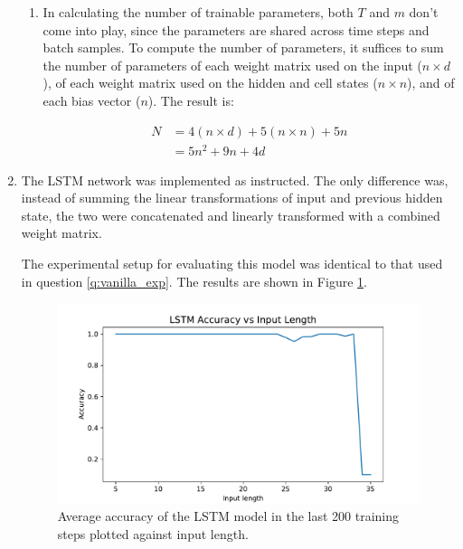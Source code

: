 \documentclass{article}
\begin{document}
\begin{enumerate}[label=\textbf{1.\arabic*}]
\begin{enumerate}[label=\textbf{(\alph*)}]
    \item
    In calculating the number of trainable parameters, both $T$ and $m$ don't come into play, since the parameters are shared across time steps and batch samples. To compute the number of parameters, it suffices to sum the number of parameters of each weight matrix used on the input ($n \times d$), of each weight matrix used on the hidden and cell states ($n \times n$), and of each bias vector ($n$). The result is:

    \begin{align*}
      N &= 4 (n \times d) + 5 (n \times n) + 5 n \\
      &= 5n^2 + 9n + 4d
    \end{align*}

  \end{enumerate}

  \item
  The LSTM network was implemented as instructed. The only difference was, instead of summing the linear transformations of input and previous hidden state, the two were concatenated and linearly transformed with a combined weight matrix.

  The experimental setup for evaluating this model was identical to that used in question \ref{q:vanilla_exp}. The results are shown in Figure \ref{fig:results_lstm}.

  \begin{figure}[h]
      \centering
      \includegraphics[scale=0.6]{img/results_LSTM.pdf}
      \caption{Average accuracy of the LSTM model in the last 200 training steps plotted against input length.}
      \label{fig:results_lstm}
  \end{figure}

\end{enumerate}

\end{document}
